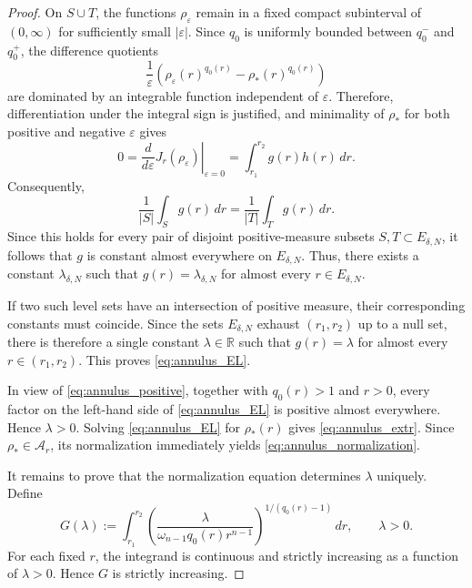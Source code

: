 \documentclass[12pt]{amsart}
\numberwithin{equation}{section}
\theoremstyle{plain}
\theoremstyle{definition}
\begin{document}
\begin{proof}
On $S\cup T$, the functions $\rho_\varepsilon$ remain in a fixed
compact subinterval of $(0,\infty)$ for sufficiently small
$|\varepsilon|$. Since $q_0$ is uniformly bounded between $q_0^-$ and
$q_0^+$, the difference quotients
\begin{equation*}
\frac{
1
}{\varepsilon}\left(\rho_\varepsilon(r)^{q_0(r)}
-
\rho_*(r)^{q_0(r)}\right)
\end{equation*}
are dominated by an integrable function independent of $\varepsilon$.
Therefore, differentiation under the integral sign is justified, and
minimality of $\rho_*$ for both positive and negative $\varepsilon$
gives
\begin{equation}
\label{eq:annulus_first_variation}
0
=
\left.
\frac{d}{d\varepsilon}
J_r(\rho_\varepsilon)
\right|_{\varepsilon=0}
=
\int_{r_1}^{r_2}
g(r)h(r)\,dr.
\end{equation}
Consequently,
\begin{equation*}
\frac{1}{|S|}\int_S g(r)\,dr
=
\frac{1}{|T|}\int_T g(r)\,dr.
\end{equation*}
Since this holds for every pair of disjoint positive-measure subsets
$S,T\subset E_{\delta,N}$, it follows that $g$ is constant almost
everywhere on $E_{\delta,N}$. Thus, there exists a constant
$\lambda_{\delta,N}$ such that $g(r)=\lambda_{\delta,N}$
for almost every $r\in E_{\delta,N}$.

If two such level sets have an intersection of positive measure, their
corresponding constants must coincide. Since the sets
$E_{\delta,N}$ exhaust $(r_1,r_2)$ up to a null set, there is therefore
a single constant $\lambda\in\mathbb R$ such that $g(r)=\lambda$ for almost every $r\in(r_1,r_2)$.
This proves \eqref{eq:annulus_EL}.

In view of
\eqref{eq:annulus_positive}, together with
$q_0(r)>1$ and $r>0$, every factor on the left-hand side of
\eqref{eq:annulus_EL} is positive almost everywhere. Hence
$\lambda>0$.
Solving \eqref{eq:annulus_EL} for $\rho_*(r)$ gives
\eqref{eq:annulus_extr}. Since $\rho_*\in\mathcal A_r$, its normalization
immediately yields \eqref{eq:annulus_normalization}.

It remains to prove that the normalization equation determines $\lambda$
uniquely. Define
\begin{equation}
\label{eq:annulus_G}
G(\lambda)
:=
\int_{r_1}^{r_2}
\left(
\frac{\lambda}
{\omega_{n-1}q_0(r)r^{n-1}}
\right)^{\!1/(q_0(r)-1)}
\,dr,
\qquad \lambda>0.
\end{equation}
For each fixed $r$, the integrand is continuous and strictly increasing
as a function of $\lambda>0$. Hence $G$ is strictly increasing.


\end{proof}
\end{document}
